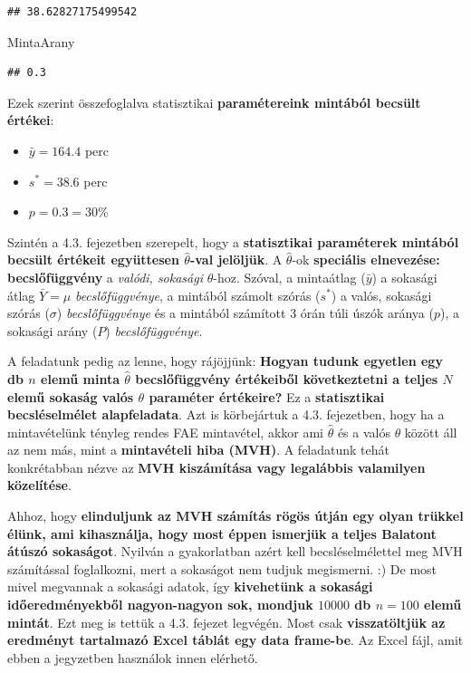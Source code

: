 \documentclass[
]{book}
\newenvironment{Shaded}{\begin{snugshade}}{\end{snugshade}}
\newcommand{\NormalTok}[1]{#1}
\providecommand{\tightlist}{%
  \setlength{\itemsep}{0pt}\setlength{\parskip}{0pt}}
\begin{document}
\begin{verbatim}
## 38.62827175499542
\end{verbatim}

\begin{Shaded}
\begin{Highlighting}[]
\NormalTok{MintaArany}
\end{Highlighting}
\end{Shaded}

\begin{verbatim}
## 0.3
\end{verbatim}

Ezek szerint összefoglalva statisztikai \textbf{paramétereink mintából becsült értékei}:

\begin{itemize}
\tightlist
\item
  \(\bar{y}=164.4\) perc
\item
  \(s^* = 38.6\) perc
\item
  \(p = 0.3=30\%\)
\end{itemize}

Szintén a 4.3. fejezetben szerepelt, hogy a \textbf{statisztikai paraméterek mintából becsült értékeit együttesen \(\hat{\theta}\)-val jelöljük}. A \(\hat{\theta}\)-ok \textbf{speciális elnevezése: becslőfüggvény} a \emph{valódi, sokasági} \(\theta\)-hoz. Szóval, a mintaátlag (\(\bar{y}\)) a sokasági átlag \(\bar{Y}=\mu\) \emph{becslőfüggvénye}, a mintából számolt szórás (\(s^*\)) a valós, sokasági szórás (\(\sigma\)) \emph{becslőfüggvénye} és a mintából számított 3 órán túli úszók aránya (\(p\)), a sokasági arány (\(P\)) \emph{becslőfüggvénye}.

A feladatunk pedig az lenne, hogy rájöjjünk: \textbf{Hogyan tudunk egyetlen egy db \(n\) elemű minta \(\hat{\theta}\) becslőfüggvény értékeiből következtetni a teljes \(N\) elemű sokaság valós \(\theta\) paraméter értékeire?} Ez a \textbf{statisztikai becsléselmélet alapfeladata}. Azt is körbejártuk a 4.3. fejezetben, hogy ha a mintavételünk tényleg rendes FAE mintavétel, akkor ami \(\hat{\theta}\) és a valós \(\theta\) között áll az nem más, mint a \textbf{mintavételi hiba (MVH)}. A feladatunk tehát konkrétabban nézve az \textbf{MVH kiszámítása vagy legalábbis valamilyen közelítése}.

Ahhoz, hogy \textbf{elinduljunk az MVH számítás rögös útján egy olyan trükkel élünk, ami kihasználja, hogy most éppen ismerjük a teljes Balatont átúszó sokaságot}. Nyilván a gyakorlatban azért kell becsléselmélettel meg MVH számítással foglalkozni, mert a sokaságot nem tudjuk megismerni. :) De most mivel megvannak a sokasági adatok, így \textbf{kivehetünk a sokasági időeredményekből nagyon-nagyon sok, mondjuk \(10000\) db \(n=100\) elemű mintát}.
Ezt meg is tettük a 4.3. fejezet legvégén. Most csak \textbf{visszatöltjük az eredményt tartalmazó Excel táblát egy data frame-be}. Az Excel fájl, amit ebben a jegyzetben használok innen elérhető.
\end{document}
